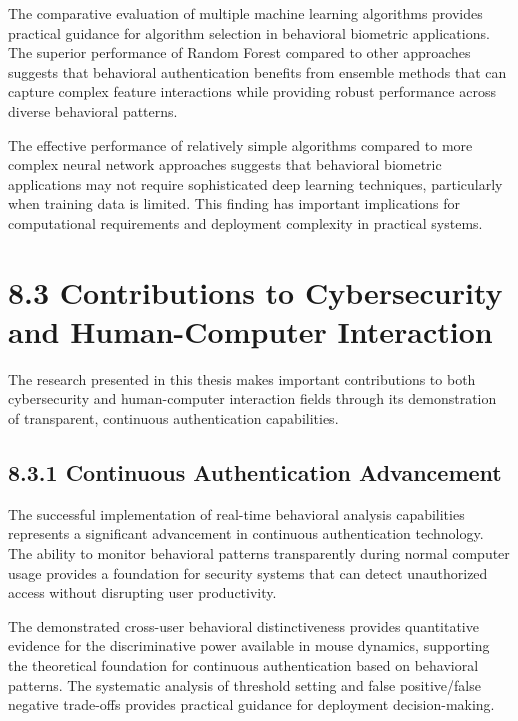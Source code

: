 \documentclass[
  12pt,
  a4paper,
]{report}
\begin{document}
The comparative evaluation of multiple machine learning algorithms
provides practical guidance for algorithm selection in behavioral
biometric applications. The superior performance of Random Forest
compared to other approaches suggests that behavioral authentication
benefits from ensemble methods that can capture complex feature
interactions while providing robust performance across diverse
behavioral patterns.

The effective performance of relatively simple algorithms compared to
more complex neural network approaches suggests that behavioral
biometric applications may not require sophisticated deep learning
techniques, particularly when training data is limited. This finding has
important implications for computational requirements and deployment
complexity in practical systems.

\section{8.3 Contributions to Cybersecurity and Human-Computer
Interaction}\label{contributions-to-cybersecurity-and-human-computer-interaction}

The research presented in this thesis makes important contributions to
both cybersecurity and human-computer interaction fields through its
demonstration of transparent, continuous authentication capabilities.

\subsection{8.3.1 Continuous Authentication
Advancement}\label{continuous-authentication-advancement}

The successful implementation of real-time behavioral analysis
capabilities represents a significant advancement in continuous
authentication technology. The ability to monitor behavioral patterns
transparently during normal computer usage provides a foundation for
security systems that can detect unauthorized access without disrupting
user productivity.

The demonstrated cross-user behavioral distinctiveness provides
quantitative evidence for the discriminative power available in mouse
dynamics, supporting the theoretical foundation for continuous
authentication based on behavioral patterns. The systematic analysis of
threshold setting and false positive/false negative trade-offs provides
practical guidance for deployment decision-making.
\end{document}

